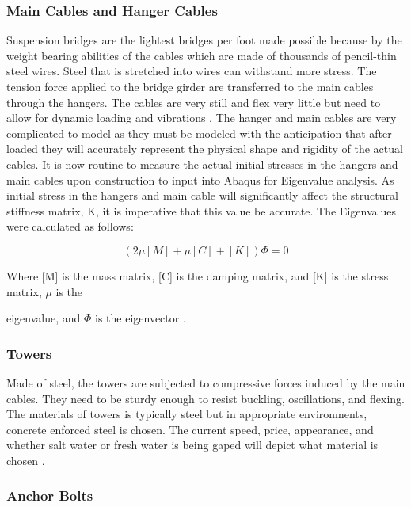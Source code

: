 \subsubsection{Main Cables and Hanger Cables}

Suspension bridges are the lightest bridges per foot made possible because by the weight bearing abilities of the cables which are made of thousands of
pencil-thin steel wires. Steel that is stretched into wires can withstand more stress. The tension force applied to the bridge girder are transferred to
the main cables through the hangers. The cables are very still and flex very little but need to allow for dynamic loading and vibrations \cite{manoj}.
The hanger and main cables are very complicated to model as they must be modeled with the anticipation that after loaded they will accurately represent
the physical shape and rigidity of the actual cables. It is now routine to measure the actual initial stresses in the hangers and main cables upon
construction to input into Abaqus for Eigenvalue analysis. As initial stress in the hangers and main cable will significantly affect the structural
stiffness matrix, K, it is imperative that this value be accurate. The Eigenvalues were calculated as follows: 


\begin{equation}
( 2 \mu [M] + \mu [C] + [K]) {\Phi} = 0
\label{eqn:Euler}
\end{equation}

Where [M] is the mass matrix, [C] is the damping matrix, and [K] is the stress matrix, $\mu$ is the 

eigenvalue, and $\Phi$ is the eigenvector \cite{manoj}. 

\subsubsection{Towers}

Made of steel, the towers are subjected to compressive forces induced by the main cables. They need to be sturdy enough to resist buckling, oscillations,
and flexing. The materials of towers is typically steel but in appropriate environments, concrete enforced steel is chosen. The current speed, price,
appearance, and whether salt water or fresh water is being gaped will depict what material is chosen \cite{manoj}. 


\subsubsection{Anchor Bolts}

